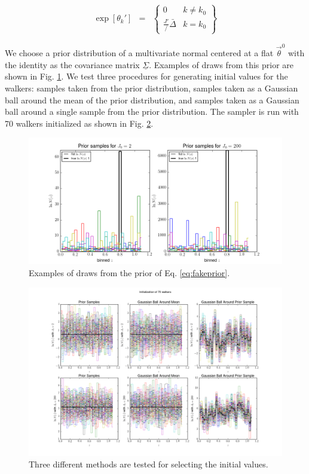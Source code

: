 \documentclass[preprint]{aastex}
\newcommand{\textul}{\underline}
\begin{document}
\begin{eqnarray}
\label{eq:faketheta}
\exp[\theta_{k}'] &=& \left\{\begin{array}{cc}0&k\neq k_{0}\\ \frac{J'}/\bar{\Delta}&k=k_{0}\end{array}\right\}
\end{eqnarray}

We choose a prior distribution of a multivariate normal centered at a flat $\vec{\theta}^{0}$ with the identity as the covariance matrix $\textul{\Sigma}$.  Examples of draws from this prior are shown in Fig. \ref{fig:fakeprior}.  We test three procedures for generating initial values for the walkers: samples taken from the prior distribution, samples taken as a Gaussian ball around the mean of the prior distribution, and samples taken as a Gaussian ball around a single sample from the prior distribution.  The sampler is run with 70 walkers initialized as shown in Fig. \ref{fig:fakeival}.

\begin{figure}
\includegraphics[width=\textwidth]{priorsamps.png}
\caption{Examples of draws from the prior of Eq. \ref{eq:fakeprior}.}
\label{fig:fakeprior}
\end{figure}

\begin{figure}
\includegraphics[width=\textwidth]{initializations.png}
\caption{Three different methods are tested for selecting the initial values.}
\label{fig:fakeival}
\end{figure}
\end{document}
